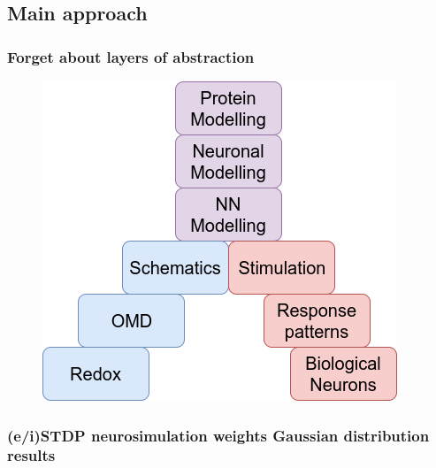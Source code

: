 \documentclass[12pt, aspectratio=169]{beamer}
\begin{document}
\subsection{Main approach}

\begin{frame}
\frametitle{Forget about layers of abstraction}
\begin{figure}
\includegraphics[width=0.6\linewidth]{layers_of_abstraction.png}
\end{figure}
\end{frame}



\subsubsection{(e/i)STDP neurosimulation weights Gaussian distribution results}
\end{document}
